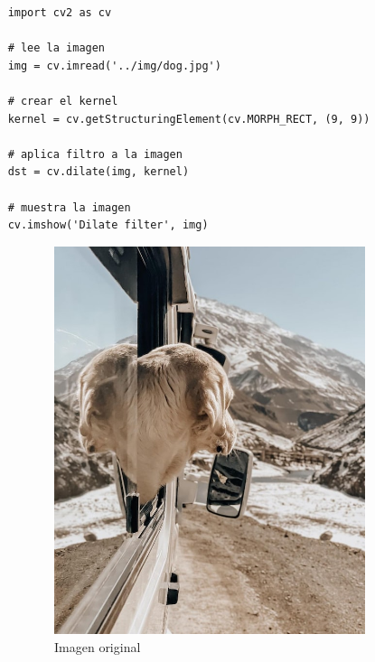 \documentclass[a4paper, 12pt]{article}
\begin{document}
\begin{lstlisting}
    import cv2 as cv

    # lee la imagen
    img = cv.imread('../img/dog.jpg')

    # crear el kernel
    kernel = cv.getStructuringElement(cv.MORPH_RECT, (9, 9))

    # aplica filtro a la imagen
    dst = cv.dilate(img, kernel)

    # muestra la imagen
    cv.imshow('Dilate filter', img)
\end{lstlisting}

\begin{figure}[!ht]
    \centering
    \begin{subfigure}{0.4\textwidth}
        \includegraphics[width=\textwidth]{img/dog.jpg}
        \caption{Imagen original}
    \end{subfigure}
    \begin{subfigure}{0.4\textwidth}

\end{subfigure}
\end{figure}
\end{document}
